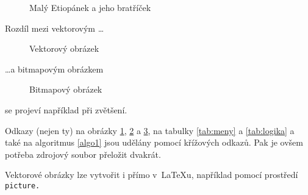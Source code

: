 \documentclass[a4paper, 11pt]{article}
\begin{document}
			\begin{figure}[h]
				\begin{center}
					\caption{Malý Etiopánek a jeho bratříček}\label{fig:etiopanek}
				\end{center}
			\end{figure}
									
			Rozdíl mezi vektorovým \dots
									
			\begin{figure}[h]
				\begin{center}
					\caption{Vektorový obrázek}\label{fig:oniisan1}
				\end{center}
			\end{figure}
			\noindent\dots a bitmapovým obrázkem
									
			\begin{figure}[h]
				\begin{center}
					\caption{Bitmapový obrázek}\label{fig:oniisan2}
				\end{center}
			\end{figure}
			\noindent se projeví například při zvětšení.
									
			Odkazy (nejen ty) na obrázky \ref*{fig:etiopanek}, \ref*{fig:oniisan1} a \ref*{fig:oniisan2}, na tabulky \ref*{tab:meny} a \ref*{tab:logika} a také na algoritmus \ref*{algo1} jsou udělány pomocí křížových
			odkazů. Pak je ovšem potřeba zdrojový soubor přeložit dvakrát.
									
			Vektorové obrázky lze vytvořit i přímo v~\LaTeX u, například pomocí prostředí\texttt{ picture.}
									
\end{document}
